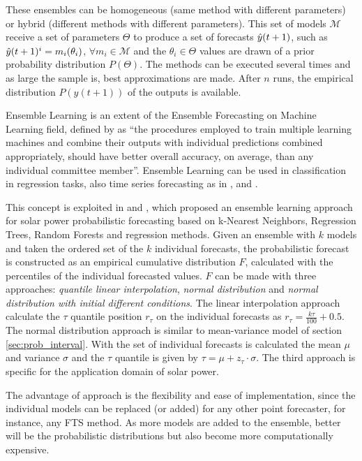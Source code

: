 These ensembles can be homogeneous (same method with different parameters) or hybrid (different methods with different parameters). This set of models $\mathcal{M}$ receive a set of parameters $\Theta$ to produce a set of forecasts $\hat{y}(t+1)$, such as $\hat{y}(t+1)^i = m_i(\theta_i)$, $\forall m_i \in \mathcal{M}$ and the $\theta_i\in \Theta$ values are drawn of a prior probability distribution $P(\Theta)$. The methods can be executed several times and as large the sample is, best approximations are made. After $n$ runs, the empirical distribution $P(y(t+1))$ of the outputs is available.

Ensemble Learning is an extent of the Ensemble Forecasting on Machine Learning field, defined by \cite{Brown2010} as ``the procedures employed to train multiple learning machines and combine their outputs with individual predictions combined appropriately, should have better overall accuracy, on average, than any individual committee member''. Ensemble Learning can be used in classification in regression tasks, also time series forecasting as in \cite{Chen2005}, \cite{Bai2010} and \cite{Koskova2015a}.

This concept is exploited in \cite{Mohammed2015} and \cite{Mohammed2016},  which proposed an ensemble learning approach for solar power probabilistic forecasting based on k-Nearest Neighbors, Regression Trees, Random Forests and regression methods. Given an ensemble with $k$ models and taken the ordered set of the $k$ individual forecasts, the probabilistic forecast is constructed as an empirical cumulative distribution $F$, calculated with the percentiles of the individual forecasted values. $F$ can be made with three approaches: \textit{quantile linear interpolation}, \textit{normal distribution} and \textit{normal distribution with initial different conditions}. The linear interpolation approach calculate the $\tau$ quantile position $r_\tau$ on the individual forecasts as $r_\tau = \frac{k\tau}{100}+0.5$. The normal distribution approach is similar to mean-variance model of section \ref{sec:prob_interval}. With the set of individual forecasts is calculated the mean $\mu$ and variance $\sigma$ and the $\tau$ quantile is given by $\tau = \mu + z_\tau\cdot\sigma$. The third approach is specific for the application domain of solar power.

The advantage of \cite{Mohammed2015} approach is the flexibility and ease of implementation, since the individual models can be replaced (or added) for any other point forecaster, for instance, any FTS method. As more models are added to the ensemble, better will be the probabilistic distributions but also become more computationally expensive. 

